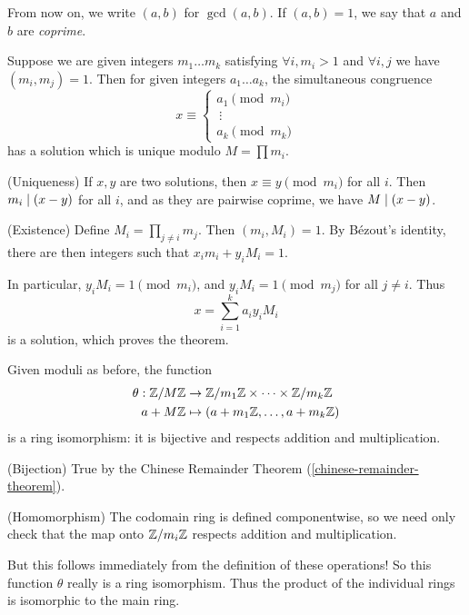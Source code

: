 \documentclass{article}
\begin{document}
\begin{note}
	From now on, we write $(a, b)$ for $\gcd (a, b)$. If $(a, b) = 1$, we say that $a$ and $b$ are \textit{coprime}.
\end{note}

\begin{theorem}
	\label{chinese-remainder-theorem}
	Suppose we are given integers $m_1 \ldots m_k$ satisfying $\forall i, m_i > 1$ and $\forall i, j$ we have $(m_i, m_j) = 1$. Then for given integers $a_1 \ldots a_k$, the simultaneous congruence
	\[
	x \equiv \begin{cases} a_1 \pmod{m_i} \\ \ \vdots \\ a_k \pmod{m_k} \end{cases}
	\]
	has a solution which is unique modulo $M = \prod m_i$.
\end{theorem}

\begin{prf}
	(Uniqueness) If $x, y$ are two solutions, then $x \equiv y \pmod{m_i}$ for all $i$. Then $m_i \mid (x - y)$ for all $i$, and as they are pairwise coprime, we have $M \mid (x - y)$.
	
	(Existence) Define $M_i = \prod_{j \neq i} m_j$. Then $(m_i, M_i) = 1$. By B\'ezout's identity, there are then integers such that $x_i m_i + y_i M_i = 1$.
	
	In particular, $y_i M_i = 1 \pmod{m_i}$, and $y_i M_i = 1 \pmod{m_j}$ for all $j \neq i$. Thus
	\[
	x = \sum_{i=1}^k a_i y_i M_i
	\]
	is a solution, which proves the theorem.
\end{prf}

\begin{theorem}
	Given moduli as before, the function
	\begin{align*}
		\theta: \mathbb{Z}/M\mathbb{Z} &\to \mathbb{Z}/m_1\mathbb{Z} \times \dots \times \mathbb{Z}/m_k\mathbb{Z} \\
		a + M\mathbb{Z} &\mapsto (a + m_1 \mathbb{Z}, \dots, a + m_k \mathbb{Z})
	\end{align*}
	is a ring isomorphism: it is bijective and respects addition and multiplication.
\end{theorem}

\begin{prf}
	(Bijection) True by the Chinese Remainder Theorem (\ref{chinese-remainder-theorem}).

	(Homomorphism) The codomain ring is defined componentwise, so we need only check that the map onto $\mathbb{Z} / m_i \mathbb{Z}$ respects addition and multiplication.

	But this follows immediately from the definition of these operations!
	So this function $\theta$ really is a ring isomorphism. Thus the product of the individual rings is isomorphic to the main ring.
\end{prf}
\end{document}
